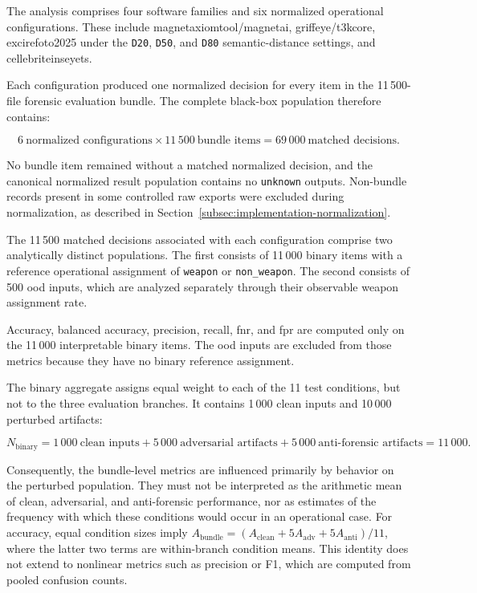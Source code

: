 The analysis comprises four software families and six normalized operational
configurations. These include
\gls{magnetaxiomtool}/\gls{magnetai},
\gls{griffeye}/\gls{t3kcore},
\gls{excirefoto2025} under the \texttt{D20}, \texttt{D50}, and
\texttt{D80} semantic-distance settings, and
\gls{cellebriteinseyets}.

Each configuration produced one normalized decision for every item in the
11\,500-file forensic evaluation bundle. The complete black-box population
therefore contains:

\begin{equation}
6\ \text{normalized configurations}
\times
11\,500\ \text{bundle items}
=
69\,000\ \text{matched decisions}.
\end{equation}

No bundle item remained without a matched normalized decision, and the
canonical normalized result population contains no \texttt{unknown} outputs. Non-bundle
records present in some controlled raw exports were excluded during
normalization, as described in
Section~\ref{subsec:implementation-normalization}.

The 11\,500 matched decisions associated with each configuration comprise two
analytically distinct populations. The first consists of 11\,000 binary items
with a reference operational assignment of \texttt{weapon} or
\texttt{non\_weapon}. The second consists of 500 \gls{ood} inputs, which are
analyzed separately through their observable weapon assignment rate.

Accuracy, balanced accuracy, precision, recall, \gls{fnr}, and \gls{fpr} are
computed only on the 11\,000 interpretable binary items. The \gls{ood} inputs
are excluded from those metrics because they have no binary reference
assignment.

The binary aggregate assigns equal weight to each of the 11 test conditions,
but not to the three evaluation branches. It contains 1\,000 clean inputs and
10\,000 perturbed artifacts:

\begin{equation}
N_{\mathrm{binary}}
=
1\,000\ \text{clean inputs}
+
5\,000\ \text{adversarial artifacts}
+
5\,000\ \text{anti-forensic artifacts}
=
11\,000.
\end{equation}

Consequently, the bundle-level metrics are influenced primarily by behavior on
the perturbed population. They must not be interpreted as the arithmetic mean
of clean, adversarial, and anti-forensic performance, nor as estimates of the
frequency with which these conditions would occur in an operational case.
For accuracy, equal condition sizes imply
\(A_{\mathrm{bundle}}=(A_{\mathrm{clean}}+5A_{\mathrm{adv}}+
5A_{\mathrm{anti}})/11\), where the latter two terms are within-branch
condition means. This identity does not extend to nonlinear metrics such as
precision or F1, which are computed from pooled confusion counts.


